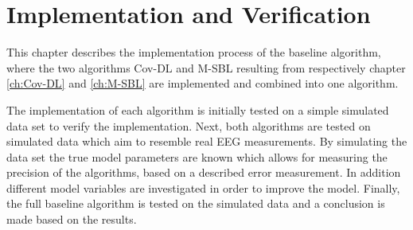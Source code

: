 \chapter{Implementation and Verification}\label{ch:implementation}
This chapter describes the implementation process of the baseline algorithm, where the two algorithms Cov-DL and M-SBL resulting from respectively chapter \ref{ch:Cov-DL} and \ref{ch:M-SBL} are implemented and combined into one algorithm.

The implementation of each algorithm is initially tested on a simple simulated data set to verify the implementation. Next, both algorithms are tested on simulated data which aim to resemble real EEG measurements. By simulating the data set the true model parameters are known which allows for measuring the precision of the algorithms, based on a described error measurement.     
In addition different model variables are investigated in order to improve the model.
Finally, the full baseline algorithm is tested on the simulated data and a conclusion is made based on the results. 







   





